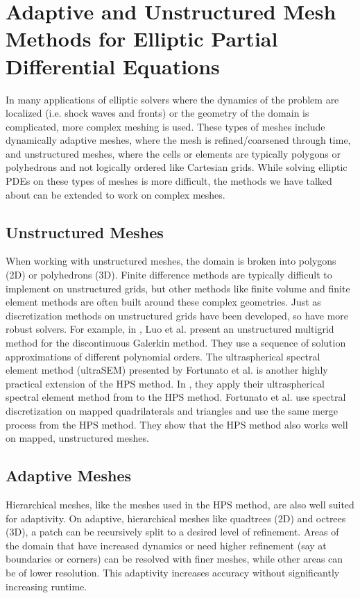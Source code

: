 \section{Adaptive and Unstructured Mesh Methods for Elliptic Partial Differential Equations}
\label{sec:adaptive}

In many applications of elliptic solvers where the dynamics of the problem are localized (i.e. shock waves and fronts) or the geometry of the domain is complicated, more complex meshing is used. These types of meshes include dynamically adaptive meshes, where the mesh is refined/coarsened through time, and unstructured meshes, where the cells or elements are typically polygons or polyhedrons and not logically ordered like Cartesian grids. While solving elliptic PDEs on these types of meshes is more difficult, the methods we have talked about can be extended to work on complex meshes.

\subsection{Unstructured Meshes}

When working with unstructured meshes, the domain is broken into polygons (2D) or polyhedrons (3D). Finite difference methods are typically difficult to implement on unstructured grids, but other methods like finite volume and finite element methods are often built around these complex geometries. Just as discretization methods on unstructured grids have been developed, so have more robust solvers. For example, in \cite{luo2006p}, Luo et al. present an unstructured multigrid method for the discontinuous Galerkin method. They use a sequence of solution approximations of different polynomial orders. The ultraspherical spectral element method (ultraSEM) presented by Fortunato et al. is another highly practical extension of the HPS method. In \cite{fortunato2020ultraspherical}, they apply their ultraspherical spectral element method from \cite{olver2013fast} to the HPS method. Fortunato et al. use spectral discretization on mapped quadrilaterals and triangles and use the same merge process from the HPS method. They show that the HPS method also works well on mapped, unstructured meshes.

\subsection{Adaptive Meshes}

Hierarchical meshes, like the meshes used in the HPS method, are also well suited for adaptivity. On adaptive, hierarchical meshes like quadtrees (2D) and octrees (3D), a patch can be recursively split to a desired level of refinement. Areas of the domain that have increased dynamics or need higher refinement (say at boundaries or corners) can be resolved with finer meshes, while other areas can be of lower resolution. This adaptivity increases accuracy without significantly increasing runtime.

